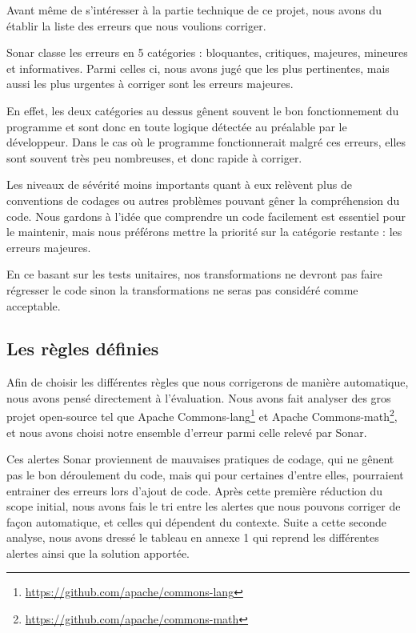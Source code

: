 \documentclass[a4paper]{article}
\begin{document}
\par Avant même de s'intéresser à la partie technique de ce projet, nous avons du établir la liste des erreurs que nous voulions corriger.
\\
\par Sonar classe les erreurs en 5 catégories : bloquantes, critiques, majeures, mineures et informatives. Parmi celles ci, nous avons jugé que les plus pertinentes, mais aussi les plus urgentes à corriger sont les erreurs majeures.
\\
\par En effet, les deux catégories au dessus gênent souvent le bon fonctionnement du programme et sont donc en toute logique détectée au préalable par le développeur. Dans le cas où le programme fonctionnerait malgré ces erreurs, elles sont souvent très peu nombreuses, et donc rapide à corriger.
\\
\par Les niveaux de sévérité moins importants quant à eux relèvent plus de conventions de codages ou autres problèmes pouvant gêner la compréhension du code. Nous gardons à l'idée que comprendre un code facilement est essentiel pour le maintenir, mais nous préférons mettre la priorité sur la catégorie restante : les erreurs majeures.
\\
\par En ce basant sur les tests unitaires, nos transformations ne devront pas faire régresser le code sinon la transformations ne seras pas considéré comme acceptable. 


\subsection{Les règles définies}

\par Afin de choisir les différentes règles que nous corrigerons de manière automatique, nous avons pensé directement à l'évaluation. Nous avons fait analyser des gros projet open-source tel que Apache Commons-lang\footnote{\url{https://github.com/apache/commons-lang}} et Apache Commons-math\footnote{\url{https://github.com/apache/commons-math}}, et nous avons choisi notre ensemble d'erreur parmi celle relevé par Sonar.
\\
\par Ces alertes Sonar proviennent de mauvaises pratiques de codage, qui ne gênent pas le bon déroulement du code, mais qui pour certaines d'entre elles, pourraient entrainer des erreurs lors d'ajout de code. Après cette première réduction du scope initial, nous avons fais le tri entre les alertes que nous pouvons corriger de façon automatique, et celles qui dépendent du contexte. Suite a cette seconde analyse, nous avons dressé le tableau en annexe 1 qui reprend les différentes alertes ainsi que la solution apportée.
\end{document}
